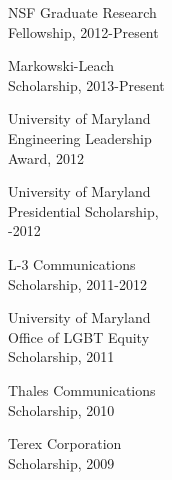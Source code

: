 \documentclass[12pt,letterpaper]{deedy-resume} %
\begin{document}
\begin{minipage}[t][6.8in]{0.33\textwidth}
\textbullet{} NSF Graduate Research\\ \quad Fellowship, 2012-Present\\
\vspace{0.1cm}

\textbullet{} Markowski-Leach\\ \quad Scholarship, 2013-Present\\
\vspace{0.1cm}

\textbullet{} University of Maryland\\ \quad Engineering Leadership\\ \quad Award, 2012\\
\vspace{0.1cm}

\textbullet{} University of Maryland\\ \quad Presidential Scholarship,\\ -2012\\
\vspace{0.1cm}

\textbullet{} L-3 Communications\\ \quad Scholarship, 2011-2012\\
\vspace{0.1cm}

\textbullet{} University of Maryland\\ \quad Office of LGBT Equity\\ \quad Scholarship, 2011\\
\vspace{0.1cm}

\textbullet{} Thales Communications\\ \quad Scholarship, 2010\\
\vspace{0.1cm}

\textbullet{} Terex Corporation\\ \quad Scholarship, 2009\\

\end{minipage}%
\hfill
%
%
\hspace{-3in}
\vspace{-0.2cm}
\end{document}
